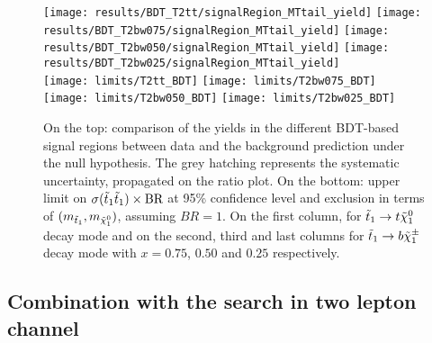     \begin{landscape}
        \thispagestyle{empty}
        \vspace*{1cm}
    \begin{figure}[h!]
        \centering
        \texttt{[image: results/BDT\_T2tt/signalRegion\_MTtail\_yield]}
        \texttt{[image: results/BDT\_T2bw075/signalRegion\_MTtail\_yield]}
        \texttt{[image: results/BDT\_T2bw050/signalRegion\_MTtail\_yield]}
        \texttt{[image: results/BDT\_T2bw025/signalRegion\_MTtail\_yield]}\\
        \texttt{[image: limits/T2tt\_BDT]}
        \texttt{[image: limits/T2bw075\_BDT]}
        \texttt{[image: limits/T2bw050\_BDT]}
        \texttt{[image: limits/T2bw025\_BDT]}
        \caption{On the top: comparison of the yields in the different BDT-based
        signal regions between data and the background prediction under the null
        hypothesis. The grey hatching represents the systematic uncertainty,
        propagated on the ratio plot.  On the bottom: upper limit on
        $\sigma(\tilde{t}_1\tilde{t}_1) \times \text{BR}$ at 95\% confidence level and
        exclusion in terms of $(m_{\tilde{t}_1},m_{\tilde{\chi}_1^0})$, assuming
        $BR = 1$. On the first column, for $\tilde{t}_1 \rightarrow t \tilde{\chi}_1^0$
        decay mode and on the second, third and last columns for $\tilde{t}_1
        \rightarrow b \tilde{\chi}_1^\pm$ decay mode with $x=0.75$, $0.50$ and $0.25$
        respectively.}
        \label{fig:resultsBDT}
    \end{figure}
    \end{landscape}
    \restoregeometry

    \subsection{Combination with the search in two lepton channel}


